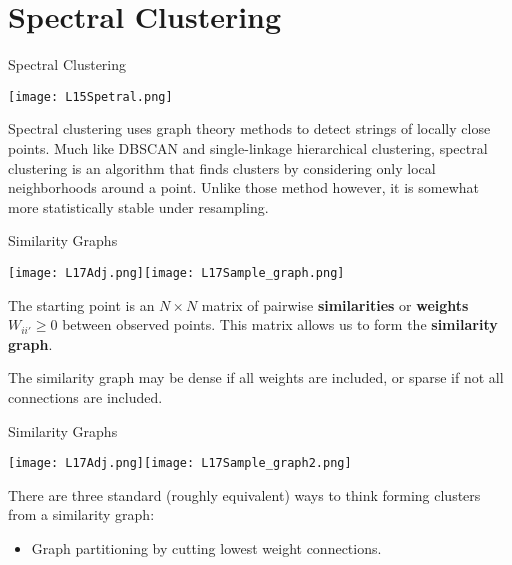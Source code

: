 \documentclass[10pt, table, dvipsnames,xcdraw, handout]{beamer}
\begin{document}
\section{Spectral Clustering}
\begin{frame}[fragile]{Spectral Clustering}
  \begin{minipage}[t][0.5\textheight][t]{\textwidth}
	\centering \texttt{[image: L15Spetral.png]} 
  \end{minipage}
  \vfill
\begin{minipage}[t][0.5\textheight][t]{\textwidth}
Spectral clustering uses graph theory methods to detect strings of locally close points. Much like DBSCAN and single-linkage hierarchical clustering, spectral clustering is an algorithm that finds clusters by considering only local neighborhoods around a point. \pause Unlike those method however, it is somewhat more statistically stable under resampling.
\end{minipage}
\end{frame}



\begin{frame}[fragile]{Similarity Graphs}
  \begin{minipage}[t][0.5\textheight][t]{\textwidth}
	\centering \texttt{[image: L17Adj.png]}\texttt{[image: L17Sample\_graph.png]} 
  \end{minipage}
  \vfill
\begin{minipage}[t][0.5\textheight][t]{\textwidth}
The starting point is an $N\times N$ matrix of pairwise \textbf{similarities} or \textbf{weights} $W_{ii'} \geq 0$ between observed points. This matrix allows us to form the \textbf{similarity graph}.\pause 

The similarity graph may be dense if all weights are included, or sparse if not all connections are included. 
\end{minipage}
\end{frame}



\begin{frame}[fragile]{Similarity Graphs}
  \begin{minipage}[t][0.5\textheight][t]{\textwidth}
	\centering \texttt{[image: L17Adj.png]}\texttt{[image: L17Sample\_graph2.png]} 
  \end{minipage}
  \vfill
\begin{minipage}[t][0.5\textheight][t]{\textwidth}
There are three standard (roughly equivalent) ways to think forming clusters from a similarity graph: 
\begin{itemize}
\item[] Graph partitioning by cutting lowest weight connections. 
\end{itemize}
\end{minipage}
\end{frame}
\end{document}
